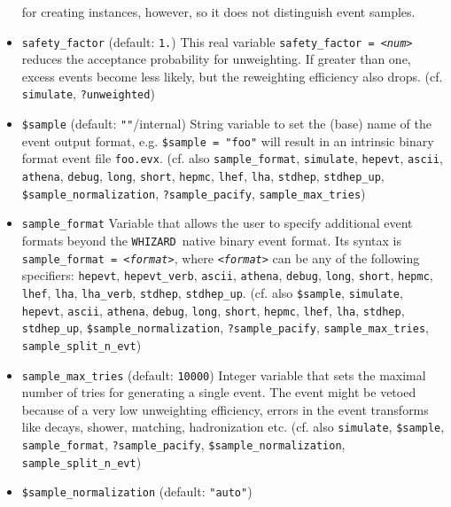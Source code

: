 \documentclass[12pt]{book}
\newcommand{\ttt}[1]{\texttt{#1}}
\newcommand{\whizard}{\texttt{WHIZARD}}
\begin{document}
\begin{itemize}
for creating instances, however, so it does not distinguish event
samples.  
\item
\ttt{safety\_factor} \qquad (default: \ttt{1.}) \newline
This real variable \ttt{safety\_factor = {\em <num>}} reduces the acceptance
probability for unweighting.  If greater than one, excess events
become less likely, but the reweighting efficiency also
drops. (cf. \ttt{simulate}, \ttt{?unweighted})
\item
\ttt{\$sample} \qquad (default: \ttt{""}/internal) \newline
String variable to set the (base) name of the event output format,
e.g. \ttt{\$sample = "foo"} will result in an intrinsic binary format
event file \ttt{foo.evx}. (cf. also \ttt{sample\_format},
\ttt{simulate}, \ttt{hepevt}, \ttt{ascii},
\ttt{athena}, \ttt{debug}, \ttt{long}, \ttt{short}, \ttt{hepmc}, 
\ttt{lhef}, \ttt{lha}, \ttt{stdhep}, \ttt{stdhep\_up},
\ttt{\$sample\_normalization}, \ttt{?sample\_pacify}, \ttt{sample\_max\_tries}) 
\item
\ttt{sample\_format} \newline
Variable that allows the user to specify additional event formats
beyond the \whizard\ native binary event format. Its syntax is 
\ttt{sample\_format = {\em <format>}}, where \ttt{{\em <format>}} can be any of
the following specifiers: \ttt{hepevt}, \ttt{hepevt\_verb}, \ttt{ascii},
\ttt{athena}, \ttt{debug}, \ttt{long}, \ttt{short}, \ttt{hepmc}, 
\ttt{lhef}, \ttt{lha}, \ttt{lha\_verb}, \ttt{stdhep}, \ttt{stdhep\_up}.
(cf. also \ttt{\$sample}, \ttt{simulate}, \ttt{hepevt}, \ttt{ascii},
\ttt{athena}, \ttt{debug}, \ttt{long}, \ttt{short}, \ttt{hepmc}, 
\ttt{lhef}, \ttt{lha}, \ttt{stdhep}, \ttt{stdhep\_up}, \newline
\ttt{\$sample\_normalization}, \ttt{?sample\_pacify},
\ttt{sample\_max\_tries}, \ttt{sample\_split\_n\_evt}) 
\item
\ttt{sample\_max\_tries} \qquad (default: \ttt{10000}) \newline
Integer variable that sets the maximal number of tries for generating
a single event. The event might be vetoed because of a very low
unweighting efficiency, errors in the event transforms like decays,
shower, matching, hadronization etc. (cf. also
\ttt{simulate}, \ttt{\$sample}, \ttt{sample\_format},
\ttt{?sample\_pacify}, \ttt{\$sample\_normalization}, \ttt{sample\_split\_n\_evt}) 
\item
\ttt{\$sample\_normalization} \qquad (default: \ttt{"auto"}) \newline

\end{itemize}
\end{document}
